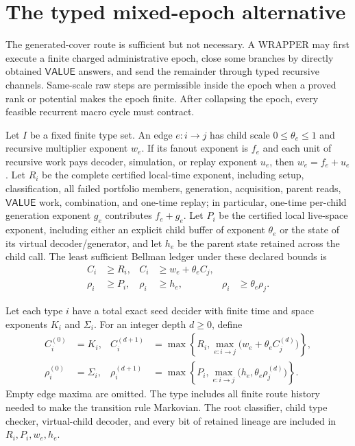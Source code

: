 \documentclass[11pt]{article}
\newcommand{\VALUE}{\mathsf{VALUE}}
\begin{document}
\section{The typed mixed-epoch alternative}
\label{sec:typed}

The generated-cover route is sufficient but not necessary.  A WRAPPER may
first execute a finite charged administrative epoch, close some branches by
directly obtained $\VALUE$ answers, and send the remainder through typed
recursive channels.  Same-scale raw steps are permissible inside the epoch
when a proved rank or potential makes the epoch finite.  After collapsing the
epoch, every feasible recurrent macro cycle must contract.

Let $I$ be a fixed finite type set.  An edge $e:i\to j$ has child scale
$0\le\theta_e\le1$ and recursive multiplier exponent $w_e$.  If its fanout
exponent is $f_e$ and each unit of recursive work pays decoder, simulation, or
replay exponent $u_e$, then $w_e=f_e+u_e$.  Let $R_i$ be the complete
certified local-time exponent, including setup, classification, all failed
portfolio members,
generation, acquisition, parent reads, $\VALUE$ work, combination, and
one-time replay; in particular, one-time per-child generation exponent $g_e$
contributes $f_e+g_e$.  Let $P_i$ be the certified local live-space
exponent, including
either an explicit child buffer of exponent $\theta_e$ or the state of its
virtual decoder/generator, and let $h_e$ be the parent state retained across
the child call.  The least sufficient Bellman ledger under these declared
bounds is
\begin{align}
 C_i&\ge R_i,& C_i&\ge w_e+\theta_eC_j,
 \label{eq:bellman-time}\\
 \rho_i&\ge P_i,& \rho_i&\ge h_e,&
 \rho_i&\ge\theta_e\rho_j.
 \label{eq:bellman-space}
\end{align}

Let each type $i$ have a total exact seed decider with finite time and space
exponents $K_i$ and $\Sigma_i$.  For an integer depth $d\ge0$, define
\begin{align}
 C_i^{(0)}&=K_i,&
 C_i^{(d+1)}&=\max\left\{R_i,
   \max_{e:i\to j}\bigl(w_e+\theta_e C_j^{(d)}\bigr)\right\},
 \label{eq:finite-time}\\
 \rho_i^{(0)}&=\Sigma_i,&
 \rho_i^{(d+1)}&=\max\left\{P_i,
   \max_{e:i\to j}\bigl(h_e,\theta_e\rho_j^{(d)}\bigr)\right\}.
 \label{eq:finite-space}
\end{align}
Empty edge maxima are omitted.  The type includes all finite route history
needed to make the transition rule Markovian.  The root classifier, child
type checker, virtual-child decoder, and every bit of retained lineage are
included in $R_i,P_i,w_e,h_e$.
\end{document}
